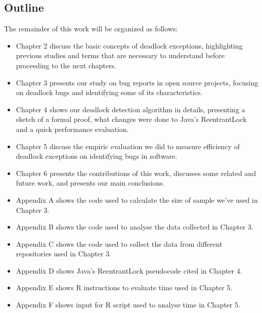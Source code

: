 \subsection{Outline}

The remainder of this work will be organized as follows:

\begin{itemize}
  \item Chapter 2 discuss the basic concepts of deadlock exceptions, highlighting previous studies and terms that are necessary to understand before proceeding to the next chapters.
  \item Chapter 3 presents our study on bug reports in open source projects, focusing on deadlock bugs and identifying some of its characteristics.
  \item Chapter 4 shows our deadlock detection algorithm in details, presenting a sketch of a formal proof, what changes were done to Java's ReentrantLock and a quick performance evaluation.
  \item Chapter 5 discuss the empiric evaluation we did to measure efficiency of deadlock exceptions on identifying bugs in software.
  \item Chapter 6 presents the contributions of this work, discusses some related and future work, and presents our main conclusions.
  \item Appendix A shows the code used to calculate the size of sample we've used in Chapter 3.
  \item Appendix B shows the code used to analyse the data collected in Chapter 3.
  \item Appendix C shows the code used to collect the data from different repositories used in Chapter 3.
  \item Appendix D shows Java's ReentrantLock pseudocode cited in Chapter 4.
  \item Appendix E shows R instructions to evaluate time used in Chapter 5.
  \item Appendix F shows input for R script used to analyse time in Chapter 5.
\end{itemize}



